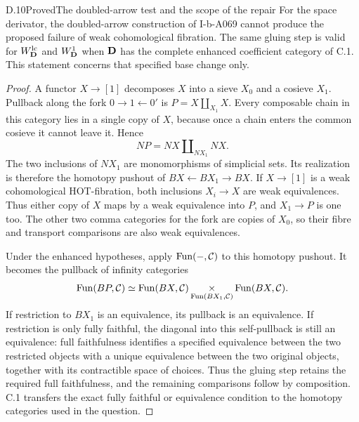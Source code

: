 \begin{claim}{D.10}{Proved}{The doubled-arrow test and the scope of the repair}
For the space derivator, the doubled-arrow construction of I-b-A069 cannot produce the proposed failure of weak cohomological fibration. The same gluing step is valid for $W^{\mathrm{lc}}_{\mathbf D}$ and $W^1_{\mathbf D}$ when $\mathbf D$ has the complete enhanced coefficient category of C.1. This statement concerns that specified base change only.
\end{claim}
\begin{proof}
A functor $X\to[1]$ decomposes $X$ into a sieve $X_0$ and a cosieve $X_1$. Pullback along the fork $0\to1\leftarrow0'$ is
$P=X\amalg_{X_1}X$. Every composable chain in this category lies in a single copy of $X$, because once a chain enters the common cosieve it cannot leave it. Hence
\[
 NP=NX\amalg_{NX_1}NX.
\]
The two inclusions of $NX_1$ are monomorphisms of simplicial sets. Its realization is therefore the homotopy pushout of $BX\leftarrow BX_1\to BX$. If $X\to[1]$ is a weak cohomological HOT-fibration, both inclusions $X_i\to X$ are weak equivalences. Thus either copy of $X$ maps by a weak equivalence into $P$, and $X_1\to P$ is one too. The other two comma categories for the fork are copies of $X_0$, so their fibre and transport comparisons are also weak equivalences.

Under the enhanced hypotheses, apply $\operatorname{Fun}(-,\mathcal C)$ to this homotopy pushout. It becomes the pullback of infinity categories
\[
 \operatorname{Fun}(BP,\mathcal C)\simeq
 \operatorname{Fun}(BX,\mathcal C)
 \mathop{\times}_{\operatorname{Fun}(BX_1,\mathcal C)}
 \operatorname{Fun}(BX,\mathcal C).
\]
If restriction to $BX_1$ is an equivalence, its pullback is an equivalence. If restriction is only fully faithful, the diagonal into this self-pullback is still an equivalence: full faithfulness identifies a specified equivalence between the two restricted objects with a unique equivalence between the two original objects, together with its contractible space of choices. Thus the gluing step retains the required full faithfulness, and the remaining comparisons follow by composition. C.1 transfers the exact fully faithful or equivalence condition to the homotopy categories used in the question.
\end{proof}

